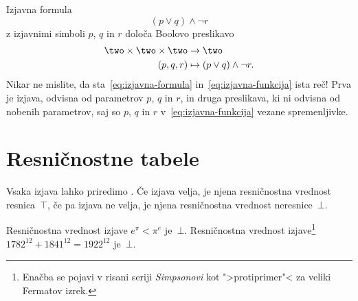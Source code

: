 \begin{zgled}
  Izjavna formula
  \begin{equation}
    \label{eq:izjavna-formula}
    (p \lor q) \land \neg r  
  \end{equation}
  z izjavnimi simboli $p$, $q$ in $r$ določa Boolovo preslikavo 
  \begin{equation}
    \label{eq:izjavna-funkcija}
    \begin{aligned}
     \two \times \two \times \two &\to \two \\
     (p, q, r) &\mapsto (p \lor q) \land \neg r.
    \end{aligned}
  \end{equation}
  Nikar ne mislite, da sta~\eqref{eq:izjavna-formula} in~\eqref{eq:izjavna-funkcija} ista reč!
  Prva je izjava, odvisna od parametrov $p$, $q$ in $r$, in druga preslikava, ki ni odvisna od nobenih parametrov,
  saj so $p$, $q$ in $r$ v~\eqref{eq:izjavna-funkcija} vezane spremenljivke.
\end{zgled}


\section{Resničnostne tabele}

Vsaka izjava lahko priredimo .
%
Če izjava velja, je njena resničnostna vrednost resnica~$\top$,
če pa izjava ne velja, je njena resničnostna vrednost neresnice~$\bot$.

\begin{zgled}
  Resničnostna vrednost izjave $e^\pi < \pi^e$ je~$\bot$.
  Resničnostna vrednost izjave\footnote{Enačba se pojavi v risani seriji \emph{Simpsonovi} kot ">protiprimer"< za veliki Fermatov izrek.} $1782^{12} + 1841^{12} = 1922^{12}$ je~$\bot$.
\end{zgled}



